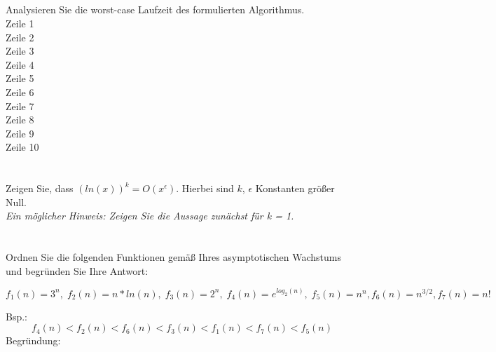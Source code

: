\documentclass[12pt]{article}
\theoremstyle{remark}
\begin{document}
\subsection{} Analysieren Sie die worst-case Laufzeit des formulierten Algorithmus. \\
Zeile 1  \\
Zeile 2  \\
Zeile 3  \\
Zeile 4  \\
Zeile 5  \\
Zeile 6  \\
Zeile 7  \\
Zeile 8  \\
Zeile 9  \\
Zeile 10 \\


\newpage
\section{}

Zeigen Sie, dass $(ln(x))^k = O(x^\epsilon).$ Hierbei sind $k$, $\epsilon$ Konstanten größer Null. \\ {\it Ein möglicher Hinweis: Zeigen Sie die Aussage zunächst für k = 1.}

\section{}

Ordnen Sie die folgenden Funktionen gemäß Ihres asymptotischen Wachstums und begründen Sie Ihre Antwort:

\[
f_1(n) = 3^n, \; f_2(n) = n*ln(n), \; f_3(n) = 2^n, \; f_4(n) = e^{log_2(n)}, \; f_5(n) = n^n, f_6(n) = n^{3/2}, f_7(n) = n!
\]

Bsp.: \\
\[
f_4(n) < f_2(n) < f_6(n) < f_3(n) < f_1(n) < f_7(n) < f_5(n)
\]
Begründung: \\
\end{document}
